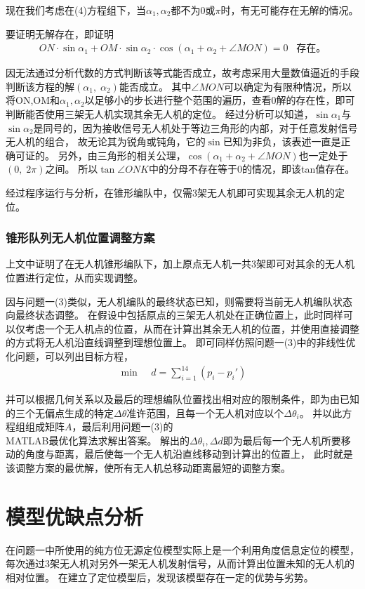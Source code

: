 \documentclass{ctexart}
\def\al{\alpha}
\def\t{\theta}
\def\sm{\sum_{i=1}^{14}}
\def\d{\Delta}
\begin{document}
	现在我们考虑在(4)方程组下，当$\al_1,\al_2$都不为0或$\pi$时，有无可能存在无解的情况。

	要证明无解存在，即证明
	\begin{align*}
		ON\cdot \sin\al_1+OM \cdot \sin\al_2\cdot \cos(\al_1+\al_2+\angle MON)=0\;\;\;\mbox{存在。}
	\end{align*}

	因无法通过分析代数的方式判断该等式能否成立，故考虑采用大量数值逼近的手段判断该方程的解$(\al_1,\;\al_2)$能否成立。
	其中$\angle MON$可以确定为有限种情况，所以将ON,OM和$\al_1,\al_2$以足够小的步长进行整个范围的遍历，查看0解的存在性，即可判断能否使用三架无人机实现其余无人机的定位。
	经过分析可以知道，$\sin\al_1$与$\sin\al_2$是同号的，因为接收信号无人机处于等边三角形的内部，对于任意发射信号无人机的组合，
	故无论其为锐角或钝角，它的$\sin$已知为非负，该表述一直是正确可证的。
	另外，由三角形的相关公理，$\cos(\al_1+\al_2+\angle MON)$也一定处于$(0,\;2\pi)$之间。
	所以$\tan \angle ONK$中的分母不存在等于0的情况，即该tan值存在。
	
	经过程序运行与分析，在锥形编队中，仅需3架无人机即可实现其余无人机的定位。

	\subsubsection{锥形队列无人机位置调整方案}
	上文中证明了在无人机锥形编队下，加上原点无人机一共3架即可对其余的无人机位置进行定位，从而实现调整。

	因与问题一(3)类似，无人机编队的最终状态已知，则需要将当前无人机编队状态向最终状态调整。
	在假设中包括原点的三架无人机处在正确位置上，此时同样可以仅考虑一个无人机点的位置，从而在计算出其余无人机的位置，并使用直接调整的方式将无人机沿直线调整到理想位置上。
	即可同样仿照问题一(3)中的非线性优化问题，可以列出目标方程，
	\begin{align*}
		\min  \;\;\;\; d=\sm (p_i-p_i')
	\end{align*}

	并可以根据几何关系以及最后的理想编队位置找出相对应的限制条件，即为由已知的三个无偏点生成的特定$\d\t$准许范围，且每一个无人机对应以个$\d\t_i$。
	并以此方程组组成矩阵$A$，最后利用问题一(3)的\\
	MATLAB最优化算法求解出答案。
	解出的$\d\t_i,\d d$即为最后每一个无人机所要移动的角度与距离，最后使每一个无人机沿直线移动到计算出的位置上，
	此时就是该调整方案的最优解，使所有无人机总移动距离最短的调整方案。

\vspace{1em}
\section{模型优缺点分析}
	在问题一中所使用的纯方位无源定位模型实际上是一个利用角度信息定位的模型，每次通过3架无人机对另外一架无人机发射信号，从而计算出位置未知的无人机的相对位置。
	在建立了定位模型后，发现该模型存在一定的优势与劣势。
\end{document}
